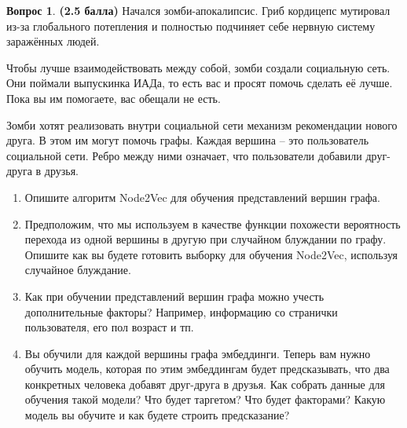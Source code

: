 \documentclass[12pt]{article}
\theoremstyle{definition}
\newtheorem{question}{Вопрос}
\begin{document}
\begin{question} \textbf{(2.5 балла)} \newline
    Начался зомби-апокалипсис. Гриб кордицепс мутировал из-за глобального потепления и полностью подчиняет себе нервную систему заражённых людей.

    Чтобы лучше взаимодействовать между собой, зомби создали социальную сеть. Они поймали выпускинка ИАДа, то есть вас и просят помочь сделать её лучше. Пока вы им помогаете, вас обещали не есть.

    Зомби хотят реализовать внутри социальной сети механизм рекомендации нового друга. В этом им могут помочь графы. Каждая вершина -- это пользователь социальной сети. Ребро между ними означает, что пользователи добавили друг-друга в друзья.

    \begin{enumerate}
        \item Опишите алгоритм Node2Vec для обучения представлений вершин графа. 
        
        \item Предположим, что мы используем в качестве функции похожести вероятность перехода из одной вершины в другую при случайном блуждании по графу. Опишите как вы будете готовить выборку для обучения Node2Vec, используя случайное блуждание. 
        
        \item Как при обучении представлений вершин графа можно учесть дополнительные факторы? Например, информацию со странички пользователя, его пол возраст и тп. 
        
        \item Вы обучили для каждой вершины графа эмбеддинги. Теперь вам нужно обучить модель, которая по этим эмбеддингам будет предсказывать, что два конкретных человека добавят друг-друга в друзья. Как собрать данные для обучения такой модели? Что будет таргетом? Что будет факторами? Какую модель вы обучите и как будете строить предсказание? 
    \end{enumerate}
\end{question}
\end{document}
